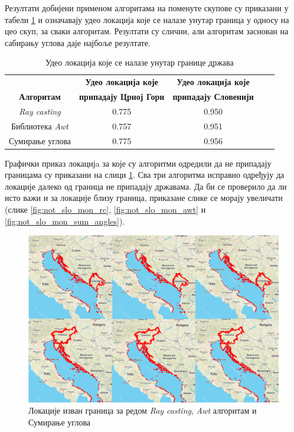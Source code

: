 \documentclass[12pt,oneside]{memoir}
\begin{document}
Резултати добијени применом алгоритама на поменуте скупове су приказани у табели \ref{tab:tabla_rez_poly_cont_algor} и означавају удео локација које се налазе унутар граница у односу на цео скуп, за сваки алгоритам. Резултати су слични, али алгоритам заснован на сабирању углова даје најбоље резултате.

\begin{table}[h!]
\begin{center}
\begin{tabular}{|c|c|c|c|c|} \hline
\textbf{ } & \textbf{Удео локација које} & \textbf{Удео локација које} \\
\textbf{Алгоритам} & \textbf{припадају Црној Гори} & \textbf{припадају Словенији} \\ \hline
\textit{Ray casting} & 0.775 & 0.950 \\ \hline
Библиотека \textit{Awt} & 0.757 & 0.951 \\ \hline
Сумирање углова & 0.775 & 0.956 \\ \hline
\end{tabular}
\caption{Удео локација које се налазе унутар границе држава}
\label{tab:tabla_rez_poly_cont_algor}
\end{center}
\end{table}

Графички приказ локацијa за које су алгоритми одредили да не припадају границама су приказани на слици \ref{fig:all_examples_map_slo_mon}. Сва три алгоритма исправно одређују да локације далеко од граница не припадају државама. Да би се проверило да ли исто важи и за локације близу граница, приказане слике се морају увеличати (слике \ref{fig:not_slo_mon_rc}, \ref{fig:not_slo_mon_awt} и \ref{fig:not_slo_mon_sum_angles}).

\begin{figure}[!ht]
  \centering
  \includegraphics[width=1.05\textwidth]{pictures/slo_mon_contains_all_rc_awt_sa.png}
  \caption{Локације изван граница за редом \textit{Ray casting}, \textit{Awt} алгоритам и Сумирање углова}
  \label{fig:all_examples_map_slo_mon}
\end{figure}
\end{document}
